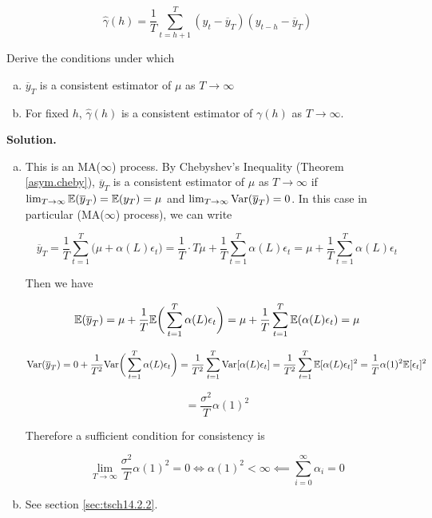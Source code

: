 \[
\hat{\gamma}(h) = \frac{1}{T} \sum_{t=h+1}^T(y_t - \overline{y}_T)(y_{t-h} - \overline{y}_T)
\]

Derive the conditions under which

\begin{enumerate}[(a)]

\item \(\overline{y}_T\) is a consistent estimator of \(\mu\) as \(T \to \infty\)

\item For fixed \(h\), \(\hat{\gamma}(h)\) is a consistent estimator of \(\gamma(h)\) as \(T \to \infty\).

\end{enumerate}

\textbf{Solution.}

\begin{enumerate}[(a)]

\item 
This is an MA(\(\infty\)) process. By Chebyshev's Inequality (Theorem \ref{asym.cheby}), \(\overline{y}_T\) is a consistent estimator of \(\mu\) as \(T \to \infty\) if \(\lim_{T \to \infty} \E(\overline{y}_T) = \E(y_T) = \mu\) and \(\lim_{T \to \infty} \Var(\overline{y}_T) = 0\). In this case in particular (MA(\(\infty\)) process), we can write

\[
\overline{y}_T = \frac{1}{T} \sum_{t=1}^T \big( \mu + \alpha(L)\epsilon_t \big) = \frac{1}{T}\cdot T \mu + \frac{1}{T} \sum_{t=1}^T \alpha(L)\epsilon_t = \mu + \frac{1}{T}\sum_{t=1}^T \alpha(L)\epsilon_t 
\]

Then we have

\[
\E(\overline{y}_T) = \mu + \frac{1}{T}\E \bigg( \sum_{t=1}^T \alpha(L)\epsilon_t  \bigg)  = \mu + \frac{1}{T} \sum_{t=1}^T  \E ( \alpha(L)\epsilon_t  ) = \mu
\]

\[
\Var(\overline{y}_T) = 0 + \frac{1}{T^2} \Var \bigg( \sum_{t=1}^T \alpha(L)\epsilon_t  \bigg) = \frac{1}{T^2} \sum_{t=1}^T \Var[ \alpha(L)\epsilon_t ] = \frac{1}{T^2} \sum_{t=1}^T \E[ \alpha(L)\epsilon_t ] ^2 = \frac{1}{T} \alpha(1)^2 \E[\epsilon_t ] ^2
\]

\[
= \frac{\sigma^2}{T} \alpha(1)^2
\]

Therefore a sufficient condition for consistency is 

\[
\lim_{T \to \infty}  \frac{\sigma^2}{T} \alpha(1)^2 = 0 \iff \alpha(1)^2 < \infty \impliedby \boxed{\sum_{i=0}^\infty \alpha_i = 0}
\]

\item See section \ref{sec:tsch14.2.2}.


\end{enumerate}
